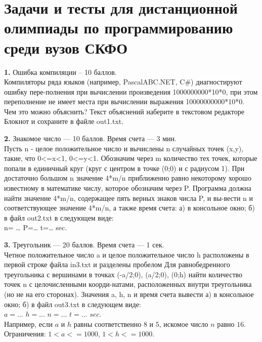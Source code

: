 ﻿\section{Задачи и тесты для дистанционной олимпиады по программированию среди вузов СКФО}\label{akm3-chap}






\textbf{1.} Ошибка компиляции – 10 баллов.\\
Компиляторы ряда языков (например, PascalABC.NET, C\#) диагностируют ошибку пере-полнения при вычислении произведения
1000000000*10*0,
при этом переполнение не имеет места при вычислении выражения 10000000000*10*0.
\\
Чем это можно объяснить? Текст объяснений наберите в текстовом редакторе Блокнот и сохраните в файле out1.txt.


\textbf{2.} Знакомое число --- 10 баллов. Время счета --- 3 мин.\\
Пусть n - целое положительное число и вычислены n случайных точек (x,y), такие, что 0<=x<1, 0<=y<1. Обозначим через m количество тех точек, которые попали в единичный круг (круг с центром в точке (0;0) и с радиусом 1). При достаточно большом n значение 4*m/n приближенно равно некоторому хорошо известному в математике числу, которое обозначим через P.
Программа должна найти значение 4*m/n, содержащее пять верных знаков числа P, и вы-вести n и соответствующее значение 4*m/n, а также время счета: а) в консольное окно; б) в файл out2.txt в следующем виде:\\
n= …         P=…         t=…    sec.


\textbf{3.} Треугольник --- 20 баллов. Время счета --- 1 сек.\\
Четное положительное число a и целое положительное число h расположены в первой строке файла in3.txt и разделены пробелом Для равнобедренного треугольника с вершинами в точках (-a/2;0), (a/2;0), (0;h) найти количество точек n с целочисленными коорди-натами, расположенных внутри треугольника (но не на его сторонах). Значения a, h, n и время счета вывести а) в консольное окно; б) в файл out3.txt в следующем виде:\\
$a = \ldots$ $h= \ldots$ $n= \ldots$ $t= \ldots$ $sec$.\\
Например, если $a$ и $h$ равны соответственно $8$ и $5$, искомое число $n$ равно $16$.\\
Ограничения: $1<a<=1000$, $1<h<=1000$.


